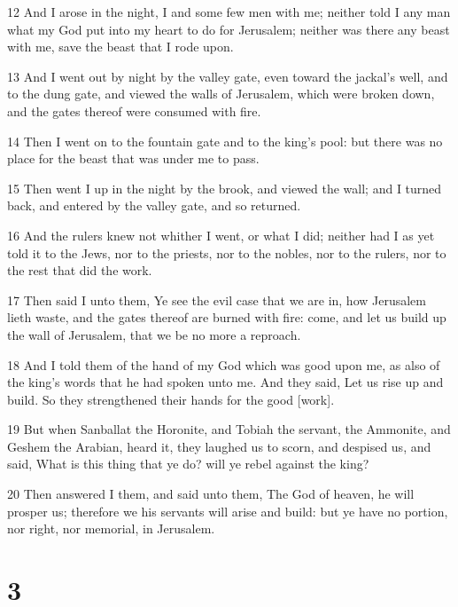 \par 12 And I arose in the night, I and some few men with me; neither told I any man what my God put into my heart to do for Jerusalem; neither was there any beast with me, save the beast that I rode upon.
\par 13 And I went out by night by the valley gate, even toward the jackal's well, and to the dung gate, and viewed the walls of Jerusalem, which were broken down, and the gates thereof were consumed with fire.
\par 14 Then I went on to the fountain gate and to the king's pool: but there was no place for the beast that was under me to pass.
\par 15 Then went I up in the night by the brook, and viewed the wall; and I turned back, and entered by the valley gate, and so returned.
\par 16 And the rulers knew not whither I went, or what I did; neither had I as yet told it to the Jews, nor to the priests, nor to the nobles, nor to the rulers, nor to the rest that did the work.
\par 17 Then said I unto them, Ye see the evil case that we are in, how Jerusalem lieth waste, and the gates thereof are burned with fire: come, and let us build up the wall of Jerusalem, that we be no more a reproach.
\par 18 And I told them of the hand of my God which was good upon me, as also of the king's words that he had spoken unto me. And they said, Let us rise up and build. So they strengthened their hands for the good [work].
\par 19 But when Sanballat the Horonite, and Tobiah the servant, the Ammonite, and Geshem the Arabian, heard it, they laughed us to scorn, and despised us, and said, What is this thing that ye do? will ye rebel against the king?
\par 20 Then answered I them, and said unto them, The God of heaven, he will prosper us; therefore we his servants will arise and build: but ye have no portion, nor right, nor memorial, in Jerusalem.

\chapter{3}

